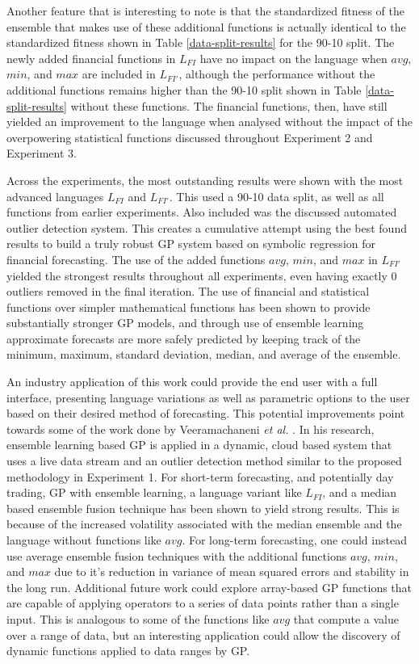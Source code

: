 \documentclass[12pt, letterpaper]{article}
\begin{document}
\textrm{ \indent Another feature that is interesting to note is that the standardized fitness of the ensemble that makes use of these additional functions is actually identical to the standardized fitness shown in Table \ref{data-split-results} for the 90-10 split. The newly added financial functions in $L_{FI}$ have no impact on the language when $avg$, $min$, and $max$ are included in $L_{FI'}$, although the performance without the additional functions remains higher than the 90-10 split shown in Table \ref{data-split-results} without these functions. The financial functions, then, have still yielded an improvement to the language when analysed without the impact of the overpowering statistical functions discussed throughout Experiment 2 and Experiment 3. }

\textrm{ \indent Across the experiments, the most outstanding results were shown with the most advanced languages $L_{FI}$ and $L_{FI'}$. This used a 90-10 data split, as well as all functions from earlier experiments. Also included was the discussed automated outlier detection system. This creates a cumulative attempt using the best found results to build a truly robust GP system based on symbolic regression for financial forecasting. The use of the added functions $avg$, $min$, and $max$ in $L_{FI'}$ yielded the strongest results throughout all experiments, even having exactly 0 outliers removed in the final iteration. The use of financial and statistical functions over simpler mathematical functions has been shown to provide substantially stronger GP models, and through use of ensemble learning approximate forecasts are more safely predicted by keeping track of the minimum, maximum, standard deviation, median, and average of the ensemble. }

\textrm{ \indent An industry application of this work could provide the end user with a full interface, presenting language variations as well as parametric options to the user based on their desired method of forecasting. This potential improvements point towards some of the work done by Veeramachaneni \textit{et al.} \cite{ensemble2}. In his research, ensemble learning based GP is applied in a dynamic, cloud based system that uses a live data stream and an outlier detection method similar to the proposed methodology in Experiment 1. For short-term forecasting, and potentially day trading, GP with ensemble learning, a language variant like $L_{FI}$, and a median based ensemble fusion technique has been shown to yield strong results. This is because of the increased volatility associated with the median ensemble and the language without functions like $avg$. For long-term forecasting, one could instead use average ensemble fusion techniques with the additional functions $avg$, $min$, and $max$ due to it's reduction in variance of mean squared errors and stability in the long run. Additional future work could explore array-based GP functions that are capable of applying operators to a series of data points rather than a single input. This is analogous to some of the functions like $avg$ that compute a value over a range of data, but an interesting application could allow the discovery of dynamic functions applied to data ranges by GP.  }
\end{document}
